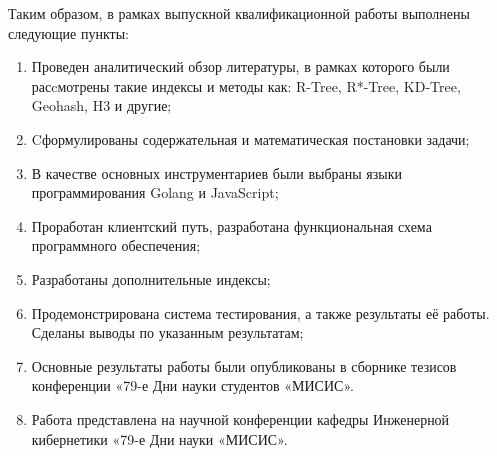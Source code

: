 \Conclusion

Таким образом, в рамках выпускной квалификационной работы выполнены следующие пункты:
\begin{enumerate}
    \item Проведен аналитический обзор литературы, в рамках которого были расcмотрены такие индексы и методы как: R-Tree, R*-Tree, KD-Tree, Geohash, H3 и другие;
    \item Cформулированы содержательная и математическая постановки задачи;
    \item В качестве основных инструментариев были выбраны языки программирования Golang и JavaScript;
    \item Проработан клиентский путь, разработана функциональная схема программного обеспечения;
    \item Разработаны дополнительные индексы;
    \item Продемонстрирована система тестирования, а также результаты её работы. Сделаны выводы по указанным результатам;
    \item Основные результаты работы были опубликованы в сборнике тезисов конференции «79-е Дни науки студентов «МИСИС»\cite{ibragimov}.
    \item Работа представлена на научной конференции кафедры Инженерной кибернетики «79-е Дни науки «МИСИС».
\end{enumerate}
